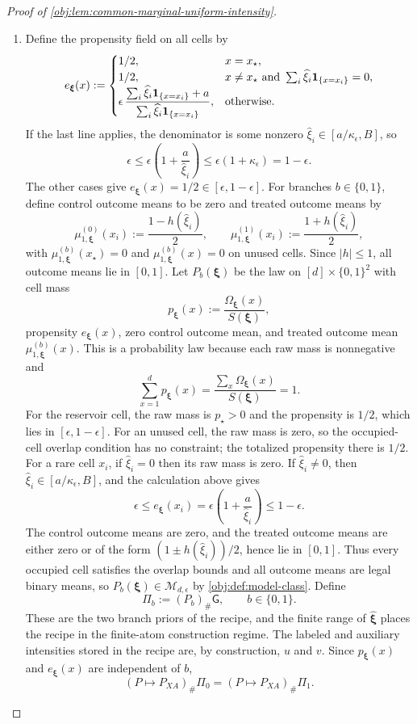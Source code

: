 \documentclass[11pt]{article}
\begin{document}
\begin{proof}[Proof of \cref{obj:lem:common-marginal-uniform-intensity}]
\begin{enumerate}
\item Define the propensity field on all cells by
\[
e_{\boldsymbol\xi}(x)
:=
\begin{cases}
1/2, & x=x_\star,\\
1/2, & x\ne x_\star\ \text{and}\ \sum_i\widehat\xi_i{\bf 1}_{\{x=x_i\}}=0,\\
\displaystyle
\epsilon\,
\frac{\sum_i\widehat\xi_i{\bf 1}_{\{x=x_i\}}+a}
{\sum_i\widehat\xi_i{\bf 1}_{\{x=x_i\}}},
& \text{otherwise}.
\end{cases}
\]
If the last line applies, the denominator is some nonzero \(\widehat\xi_i\in[a/\kappa_\epsilon,B]\), so
\[
\epsilon
\le
\epsilon\left(1+\frac{a}{\widehat\xi_i}\right)
\le
\epsilon(1+\kappa_\epsilon)
=1-\epsilon .
\]
The other cases give \(e_{\boldsymbol\xi}(x)=1/2\in[\epsilon,1-\epsilon]\). For branches \(b\in\{0,1\}\), define control outcome means to be zero and treated outcome means by
\[
\mu_{1,\boldsymbol\xi}^{(0)}(x_i)
:=
\frac{1-h(\widehat\xi_i)}2,\qquad
\mu_{1,\boldsymbol\xi}^{(1)}(x_i)
:=
\frac{1+h(\widehat\xi_i)}2,
\]
with \(\mu_{1,\boldsymbol\xi}^{(b)}(x_\star)=0\) and
\(\mu_{1,\boldsymbol\xi}^{(b)}(x)=0\) on unused cells. Since \(|h|\le1\), all outcome means lie in \([0,1]\). Let \(P_b(\boldsymbol\xi)\) be the law on \([d]\times\{0,1\}^2\) with cell mass
\[
p_{\boldsymbol\xi}(x):=\frac{\Omega_{\boldsymbol\xi}(x)}{S(\boldsymbol\xi)},
\]
propensity \(e_{\boldsymbol\xi}(x)\), zero control outcome mean, and treated outcome mean \(\mu_{1,\boldsymbol\xi}^{(b)}(x)\). This is a probability law because each raw mass is nonnegative and
\[
\sum_{x=1}^d p_{\boldsymbol\xi}(x)
=
\frac{\sum_x\Omega_{\boldsymbol\xi}(x)}{S(\boldsymbol\xi)}=1 .
\]
For the reservoir cell, the raw mass is \(p_\star>0\) and the propensity is \(1/2\), which lies in \([\epsilon,1-\epsilon]\). For an unused cell, the raw mass is zero, so the occupied-cell overlap condition has no constraint; the totalized propensity there is \(1/2\). For a rare cell \(x_i\), if \(\widehat\xi_i=0\) then its raw mass is zero. If \(\widehat\xi_i\ne0\), then \(\widehat\xi_i\in[a/\kappa_\epsilon,B]\), and the calculation above gives
\[
\epsilon\le e_{\boldsymbol\xi}(x_i)
=\epsilon\left(1+\frac a{\widehat\xi_i}\right)
\le 1-\epsilon .
\]
The control outcome means are zero, and the treated outcome means are either zero or of the form \((1\pm h(\widehat\xi_i))/2\), hence lie in \([0,1]\). Thus every occupied cell satisfies the overlap bounds and all outcome means are legal binary means, so \(P_b(\boldsymbol\xi)\in\mathcal M_{d,\epsilon}\) by \cref{obj:def:model-class}. Define
\[
\Pi_b:=(P_b)_\#\mathsf G,\qquad b\in\{0,1\}.
\]
These are the two branch priors of the recipe, and the finite range of \(\widehat{\boldsymbol\xi}\) places the recipe in the finite-atom construction regime. The labeled and auxiliary intensities stored in the recipe are, by construction, \(u\) and \(v\). Since \(p_{\boldsymbol\xi}(x)\) and \(e_{\boldsymbol\xi}(x)\) are independent of \(b\),
\[
(P\mapsto P_{XA})_\#\Pi_0
=
(P\mapsto P_{XA})_\#\Pi_1 .
\]


\end{enumerate}
\end{proof}
\end{document}
